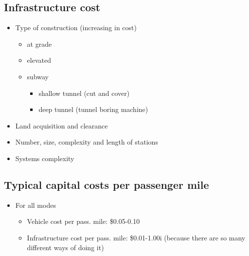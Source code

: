 \documentclass[11pt]{article}
\begin{document}
\subsection{Infrastructure cost}
\label{sec:org5e39c13}
\begin{itemize}
\item Type of construction (increasing in cost)
\begin{itemize}
\item at grade
\item elevated
\item subway
\begin{itemize}
\item shallow tunnel (cut and cover)
\item deep tunnel (tunnel boring machine)
\end{itemize}
\end{itemize}
\item Land acquisition and clearance
\item Number, size, complexity and length of stations
\item Systems complexity
\end{itemize}

\subsection{Typical capital costs per passenger mile}
\label{sec:orge1687a2}
\begin{itemize}
\item For all modes
\begin{itemize}
\item Vehicle cost per pass. mile: \$0.05-0.10
\item Infrastructure cost per pass. mile: \$0.01-1.00i (because there are so many different ways of doing it)
\end{itemize}
\end{itemize}
\end{document}
